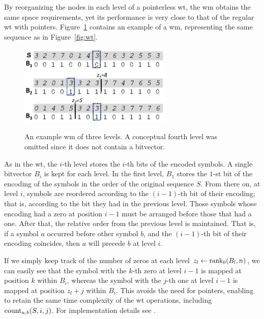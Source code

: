 \documentclass[a4paper,10pt,twoside]{book}
\begin{document}
    By reorganizing the nodes in each level of a pointerless \gls{wt}, the \gls{wm} \cite{CNO15} obtains the  same space requirements, yet its performance is very close 
    to that of the regular \gls{wt} with pointers. Figure~\ref{fig:wm} contains an example of a \gls{wm}, representing the same sequence as in Figure~\ref{fig:wt}.
    
    \begin{figure}[ht]
	\begin{center}
		{\includegraphics[width=0.65\textwidth]{figures/wm1.eps}}
	\end{center}
	\caption{An example \acrlong{wm} of three levels. A conceptual fourth level was omitted since it does not contain a bitvector.}
	\label{fig:wm}
	\end{figure}
    
    As in the \gls{wt}, the $i$-th level stores the $i$-th bits of the encoded symbols. 
    A single bitvector $B_i$ is kept for each level. In the first level, $B_1$ stores the
    $1$-st bit of the encoding of the symbols in the order of the original sequence $S$.
    From there on, at level $i$, symbols are reordered according to the $(i-1)$-th bit of their encoding; 
    that is, according to the bit they had in the previous level.
    Those symbols whose encoding had a zero at position $i-1$ must be arranged before those that
    had a one. After that, the relative order from the previous level is maintained. That is, if 
    a symbol $a$ occurred before other symbol $b$, and the $(i-1)$-th bit of their encoding
    coincides, then $a$ will precede $b$ at level $i$. %
    
    If we simply keep track of the number of zeros at each level $z_l\leftarrow \operatorname{rank}_0(B_l,n)$, we can easily see that the symbol with the $k$-th zero
    at level $i-1$ is mapped at position $k$ within $B_i$, whereas the symbol with the $j$-th one at level $i-1$ is 
    mapped at position $z_l +j$ within $B_i$. This avoids the need for pointers, enabling to retain
    the same time complexity of the \gls{wt} operations, including $\operatorname{count}_{a,b}(S,i,j)$. For 
    implementation details see \cite{CNO15,ordonez2015statistical}. 
    
\end{document}
